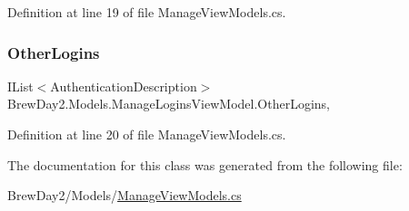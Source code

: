 Definition at line 19 of file Manage\+View\+Models.\+cs.

\mbox{\label{class_brew_day2_1_1_models_1_1_manage_logins_view_model_aadb8cb91c86a81388a5f4268769a8099}} 
\subsubsection{\texorpdfstring{Other\+Logins}{OtherLogins}}
{\footnotesize\ttfamily I\+List$<$Authentication\+Description$>$ Brew\+Day2.\+Models.\+Manage\+Logins\+View\+Model.\+Other\+Logins\hspace{0.3cm}{\ttfamily [get]}, {\ttfamily [set]}}



Definition at line 20 of file Manage\+View\+Models.\+cs.



The documentation for this class was generated from the following file\+:\begin{DoxyCompactItemize}
\item 
Brew\+Day2/\+Models/\mbox{\hyperlink{_manage_view_models_8cs}{Manage\+View\+Models.\+cs}}\end{DoxyCompactItemize}
